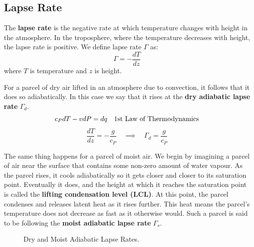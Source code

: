\subsection{Lapse Rate}
\label{sec:lapse_rate}

The \textbf{lapse rate} is the negative rate at which temperature changes with height in the atmosphere. In the troposphere,
where the temperature decreases with height, the lapse rate is positive. We define lapse rate $\Gamma$ as:
$$
\Gamma = -\frac{dT}{dz}
$$
where $T$ is temperature and $z$ is height.

For a parcel of dry air lifted in an atmosphere due to convection, it follows that it does so adiabatically. In this case
we say that it rises at the \textbf{dry adiabatic lapse rate} $\Gamma_d$. 
$$
c_PdT - vdP = dq \quad \text{1st Law of Thermodynamics} \\
$$
$$
\frac{dT}{dz} = - \frac{g}{c_P} \quad \implies \quad \boxed{\Gamma_d = \frac{g}{c_P}}
$$

The same thing happens for a parcel of moist air. We begin by imagining a parcel 
of air near the surface that contains some non-zero amount of water vapour. As the
parcel rises, it cools adiabatically so it gets closer and closer to its saturation
point. Eventually it does, and the height at which it reaches the saturation point
is called the \textbf{lifting condensation level (LCL)}. At this point, the parcel
condenses and releases latent heat as it rises further. This heat means the parcel's
temperature does not decrease as fast as it otherwise would. Such a parcel is said
to be following the \textbf{moist adiabatic lapse rate} $\Gamma_s$.

\begin{figure}
    \centering
    \caption{Dry and Moist Adiabatic Lapse Rates.}
    \label{fig:adiabatic_lapse_rates}
\end{figure}

